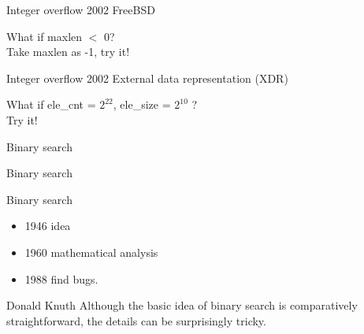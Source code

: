 \documentclass{beamer}
\begin{document}
\begin{CJK*}{UTF8}{bsmi}
    \begin{frame}{Integer overflow}
        2002 FreeBSD
        
        What if maxlen $<$ 0?\\
        Take maxlen as -1, try it!
    \end{frame}

    \begin{frame}{Integer overflow}
        2002 External data representation (XDR)
        
        What if ele\_cnt = $2^{22}$, ele\_size = $2^{10}$ ?\\
        Try it!
    \end{frame}

    \begin{frame}{Binary search}
        
    \end{frame}

    \begin{frame}{Binary search}
        
    \end{frame}

    \begin{frame}{Binary search}
        \begin{itemize}
            \item 1946 idea
            \item 1960 mathematical analysis
            \item 1988 find bugs.
        \end{itemize}
        \begin{block}{Donald Knuth}
            Although the basic idea of binary search is comparatively straightforward, the details can be surprisingly tricky.
        \end{block}
    \end{frame}


\end{CJK*}
\end{document}
